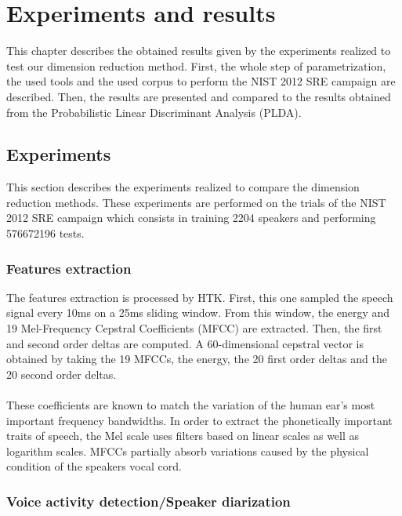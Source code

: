 \documentclass{techrep}
\begin{document}
\chapter{Experiments and results}

This chapter describes the obtained results given by the experiments
realized to test our dimension reduction method. First, the whole step
of parametrization, the used tools and the used corpus to perform
the NIST 2012 SRE campaign are described. Then, the results are
presented and compared to the results obtained from the Probabilistic
Linear Discriminant Analysis (PLDA).

\section{Experiments}


This section describes the experiments realized to compare the
dimension reduction methods. These experiments are performed on the
trials of the NIST 2012 SRE campaign which consists in training 2204
speakers and performing 576672196 tests. %

\subsection{Features extraction}

The features extraction is processed by HTK. First, this one sampled
the speech signal every 10ms on a 25ms sliding window. From this
window, the energy and 19 Mel-Frequency Cepstral Coefficients (MFCC)
are extracted.  Then, the first and second order deltas are
computed. A 60-dimensional cepstral vector is obtained by taking the
19 MFCCs, the energy, the 20 first order deltas and the 20 second
order deltas.\\\\
These coefficients are known to match the variation of the human ear's
most important frequency bandwidths. In order to extract the
phonetically important traits of speech, the Mel scale uses filters
based on linear scales as well as logarithm scales. MFCCs partially
absorb variations caused by the physical condition of the speakers
vocal cord.

\subsection{Voice activity detection/Speaker diarization}
\end{document}
